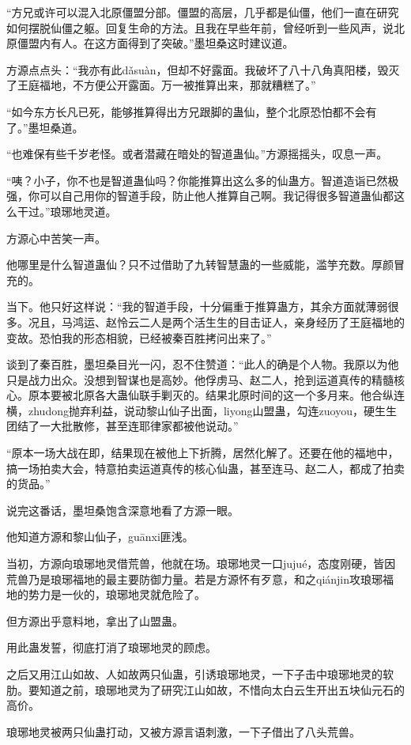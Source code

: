 \begin{this_body}
“方兄或许可以混入北原僵盟分部。僵盟的高层，几乎都是仙僵，他们一直在研究如何摆脱仙僵之躯。回复生命的方法。且我在早些年前，曾经听到一些风声，说北原僵盟内有人。在这方面得到了突破。”墨坦桑这时建议道。

方源点点头：“我亦有此dǎsuàn，但却不好露面。我破坏了八十八角真阳楼，毁灭了王庭福地，不方便公开露面。万一被推算出来，那就糟糕了。”

“如今东方长凡已死，能够推算得出方兄跟脚的蛊仙，整个北原恐怕都不会有了。”墨坦桑道。

“也难保有些千岁老怪。或者潜藏在暗处的智道蛊仙。”方源摇摇头，叹息一声。

“咦？小子，你不也是智道蛊仙吗？你能推算出这么多的仙蛊方。智道造诣已然极强，你可以自己用你的智道手段，防止他人推算自己啊。我记得很多智道蛊仙都这么干过。”琅琊地灵道。

方源心中苦笑一声。

他哪里是什么智道蛊仙？只不过借助了九转智慧蛊的一些威能，滥竽充数。厚颜冒充的。

当下。他只好这样说：“我的智道手段，十分偏重于推算蛊方，其余方面就薄弱很多。况且，马鸿运、赵怜云二人是两个活生生的目击证人，亲身经历了王庭福地的变故。恐怕我的形态相貌，已经被秦百胜拷问出来了。”

谈到了秦百胜，墨坦桑目光一闪，忍不住赞道：“此人的确是个人物。我原以为他只是战力出众。没想到智谋也是高妙。他俘虏马、赵二人，抢到运道真传的精髓核心。原本要被北原各大蛊仙联手剿灭的。结果北原时间的这一个多月来。他合纵连横，zhudong抛弃利益，说动黎山仙子出面，liyong山盟蛊，勾连zuoyou，硬生生团结了一大批散修，甚至连耶律家都被他说动。”

“原本一场大战在即，结果现在被他上下折腾，居然化解了。还要在他的福地中，搞一场拍卖大会，特意拍卖运道真传的核心仙蛊，甚至连马、赵二人，都成了拍卖的货品。”

说完这番话，墨坦桑饱含深意地看了方源一眼。

他知道方源和黎山仙子，guānxi匪浅。

当初，方源向琅琊地灵借荒兽，他就在场。琅琊地灵一口jujué，态度刚硬，皆因荒兽乃是琅琊福地的最主要防御力量。若是方源怀有歹意，和之qiánjin攻琅琊福地的势力是一伙的，琅琊地灵就危险了。

但方源出乎意料地，拿出了山盟蛊。

用此蛊发誓，彻底打消了琅琊地灵的顾虑。

之后又用江山如故、人如故两只仙蛊，引诱琅琊地灵，一下子击中琅琊地灵的软肋。要知道之前，琅琊地灵为了研究江山如故，不惜向太白云生开出五块仙元石的高价。

琅琊地灵被两只仙蛊打动，又被方源言语刺激，一下子借出了八头荒兽。


\end{this_body}
